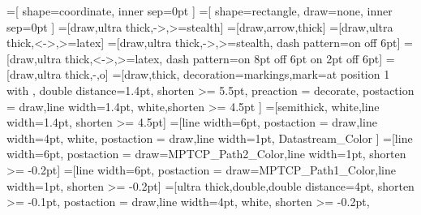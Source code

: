 %
%
=[%
	shape=coordinate,%
	inner sep=0pt%
]%
=[%
	shape=rectangle,%
	draw=none,%
	inner sep=0pt%
]%
%
%
%
%
%
%
%
%
%
%
%
%
=[draw,ultra thick,->,>=stealth]%
=[draw,arrow,thick]%
=[draw,ultra thick,<->,>=latex]%
=[draw,ultra thick,->,>=stealth,
	dash pattern=on \pgflinewidth off 6pt]%
=[draw,ultra thick,<->,>=latex,
	dash pattern=on 8pt off 6pt on 2pt off 6pt]%
=[draw,ultra thick,-,o]%
=[draw,thick, decoration={markings,mark=at position%
    1 with {}},%
    double distance=1.4pt, shorten >= 5.5pt,%
    preaction = {decorate},%
    postaction = {draw,line width=1.4pt, white,shorten >= 4.5pt}%
]%
%
%
%
%
%
%
=[semithick, white,line width=1.4pt, shorten >= 4.5pt]%
=[line width=6pt,%
	postaction = {draw,line width=4pt, white},%
	postaction = {draw,line width=1pt, Datastream_Color}
]%
=[line width=6pt,%
	postaction = {draw=MPTCP_Path2_Color,line width=1pt, shorten >= -0.2pt}]%
=[line width=6pt,%
	postaction = {draw=MPTCP_Path1_Color,line width=1pt, shorten >= -0.2pt}]%
%
=[ultra thick,double,double distance=4pt,%
	shorten >= -0.1pt,%
	postaction = {draw,line width=4pt, white, shorten >= -0.2pt},%
